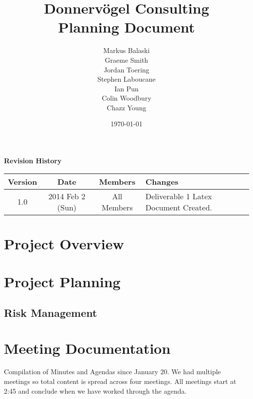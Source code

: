 \documentclass{article}
\begin{document}
\title{Donnervögel Consulting \\ Planning Document}
\author{Markus Balaski \\ Graeme Smith \\ Jordan Toering \\ Stephen Laboucane \\ Ian Pun \\ Colin Woodbury \\ Chazz Young}
\date{\today}
\maketitle
\clearpage

\textbf{Revision History}
\begin{center}
  \begin{tabular}{| c | c | c | l |}
    \hline
    Version & Date & Members & Changes\\
    \hline
    1.0 & 2014 Feb 2 (Sun) & All Members & Deliverable 1 Latex Document Created.\\
    \hline
  \end{tabular}
\end{center}
\clearpage

\tableofcontents
\clearpage


\section{Project Overview}

\section{Project Planning}
\subsection{Risk Management}

\section{Meeting Documentation}
Compilation of Minutes and Agendas since January 20.  We had multiple meetings so total content is spread across four meetings.  All meetings start at 2:45 and conclude when we have worked through the agenda.
\end{document}
